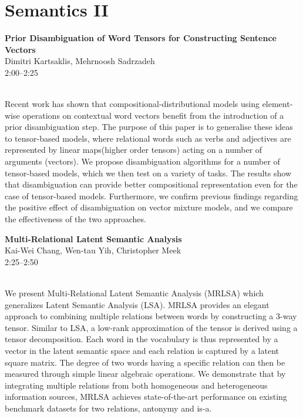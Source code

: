 \documentclass[twoside,makeidx]{book}
\begin{document}
\section{Semantics II}
\vspace{-1em}
\par\vspace{2em}\noindent%
\begin{minipage}{\linewidth}%
\begin{center}
\textbf{\normalsize Prior Disambiguation of Word Tensors for Constructing Sentence Vectors}\\
\normalsize  Dimitri Kartsaklis,  Mehrnoosh Sadrzadeh\\
{\small 2:00--2:25}\\
\end{center}
\end{minipage}\\[0.5em]
\nopagebreak%
\noindent%
{\small Recent work has shown that compositional-distributional models using element-wise operations on contextual word vectors benefit from the introduction of a prior disambiguation step. The purpose of this paper is to generalise these ideas to tensor-based models, where relational words such as verbs and adjectives are represented by linear maps(higher order tensors) acting on a number of arguments (vectors). We propose disambiguation algorithms for a number of tensor-based models, which we then test on a variety of tasks. The results show that disambiguation can provide better compositional representation even for the case of tensor-based models. Furthermore, we confirm previous findings regarding the positive effect of disambiguation on vector mixture models, and we compare the effectiveness of the two approaches.}
\par\vspace{2em}\noindent%
\begin{minipage}{\linewidth}%
\begin{center}
\textbf{\normalsize Multi-Relational Latent Semantic Analysis}\\
\normalsize  Kai-Wei Chang,  Wen-tau Yih,  Christopher Meek\\
{\small 2:25--2:50}\\
\end{center}
\end{minipage}\\[0.5em]
\nopagebreak%
\noindent%
{\small We present Multi-Relational Latent Semantic Analysis (MRLSA) which generalizes Latent Semantic Analysis (LSA). MRLSA provides an elegant approach to combining multiple relations between words by constructing a 3-way tensor.  Similar to LSA, a low-rank approximation of the tensor is derived using a tensor decomposition. Each word in the vocabulary is thus represented by a vector in the latent semantic space and each relation is captured by a latent square matrix. The degree of two words having a specific relation can then be measured through simple linear algebraic operations.  We demonstrate that by integrating multiple relations from both homogeneous and heterogeneous information sources, MRLSA achieves state-of-the-art performance on existing benchmark datasets for two relations, antonymy and is-a.}
\end{document}
